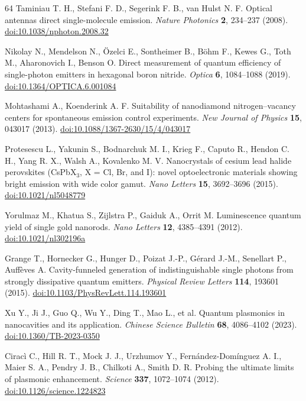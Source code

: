 \begin{thebibliography}{64}
 Taminiau T. H., Stefani F. D., Segerink F. B., van Hulst N. F. Optical antennas direct single-molecule emission. \textit{Nature Photonics} \textbf{2}, 234--237 (2008). \href{https://doi.org/10.1038/nphoton.2008.32}{doi:10.1038/nphoton.2008.32}

 Nikolay N., Mendelson N., Özelci E., Sontheimer B., Böhm F., Kewes G., Toth M., Aharonovich I., Benson O. Direct measurement of quantum efficiency of single-photon emitters in hexagonal boron nitride. \textit{Optica} \textbf{6}, 1084--1088 (2019). \href{https://doi.org/10.1364/OPTICA.6.001084}{doi:10.1364/OPTICA.6.001084}

 Mohtashami A., Koenderink A. F. Suitability of nanodiamond nitrogen–vacancy centers for spontaneous emission control experiments. \textit{New Journal of Physics} \textbf{15}, 043017 (2013). \href{https://doi.org/10.1088/1367-2630/15/4/043017}{doi:10.1088/1367-2630/15/4/043017}

 Protesescu L., Yakunin S., Bodnarchuk M. I., Krieg F., Caputo R., Hendon C. H., Yang R. X., Walsh A., Kovalenko M. V. Nanocrystals of cesium lead halide perovskites (CsPbX$_{3}$, X = Cl, Br, and I): novel optoelectronic materials showing bright emission with wide color gamut. \textit{Nano Letters} \textbf{15}, 3692--3696 (2015). \href{https://doi.org/10.1021/nl5048779}{doi:10.1021/nl5048779}

 Yorulmaz M., Khatua S., Zijlstra P., Gaiduk A., Orrit M. Luminescence quantum yield of single gold nanorods. \textit{Nano Letters} \textbf{12}, 4385--4391 (2012). \href{https://doi.org/10.1021/nl302196a}{doi:10.1021/nl302196a}

 Grange T., Hornecker G., Hunger D., Poizat J.-P., Gérard J.-M., Senellart P., Auffèves A. Cavity-funneled generation of indistinguishable single photons from strongly dissipative quantum emitters. \textit{Physical Review Letters} \textbf{114}, 193601 (2015). \href{https://doi.org/10.1103/PhysRevLett.114.193601}{doi:10.1103/PhysRevLett.114.193601}

 Xu Y., Ji J., Guo Q., Wu Y., Ding T., Mao L., et al. Quantum plasmonics in nanocavities and its application. \textit{Chinese Science Bulletin} \textbf{68}, 4086--4102 (2023). \href{https://doi.org/10.1360/TB-2023-0350}{doi:10.1360/TB-2023-0350}

 Ciracì C., Hill R. T., Mock J. J., Urzhumov Y., Fernández-Domínguez A. I., Maier S. A., Pendry J. B., Chilkoti A., Smith D. R. Probing the ultimate limits of plasmonic enhancement. \textit{Science} \textbf{337}, 1072--1074 (2012). \href{https://doi.org/10.1126/science.1224823}{doi:10.1126/science.1224823}


\end{thebibliography}

